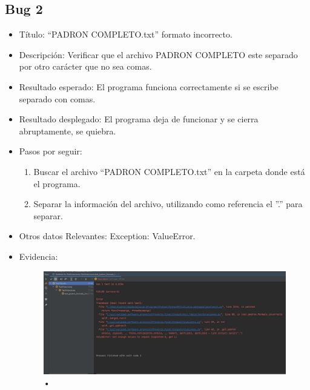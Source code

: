 \documentclass[conference]{IEEEtran}
\begin{document}
\subsection*{Bug 2}
\begin{itemize}
\item Título: “PADRON COMPLETO.txt” formato incorrecto.

\item Descripción: Verificar que el archivo PADRON COMPLETO este separado por otro carácter que no sea comas.

\item Resultado esperado: El programa funciona correctamente si se escribe separado con comas.

\item Resultado desplegado: El programa deja de funcionar y se cierra abruptamente, se quiebra.  

\item Pasos por seguir: 
\begin{enumerate}
\item Buscar el archivo “PADRON COMPLETO.txt” en la carpeta donde está el programa.  
\item Separar la información del archivo, utilizando como referencia el ”.” para separar.
\end{enumerate}
\item Otros datos Relevantes: Exception: ValueError.
\item Evidencia:
\begin{figure}[H]
\centering
\includegraphics[scale=0.2]{imagenes/padron_formato_incorrecto.jpeg}
\caption{•}
\end{figure}

\end{itemize}
\end{document}
